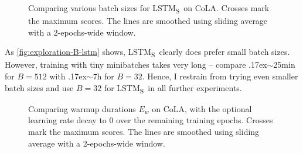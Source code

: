 \documentclass[bsc,frontabs,twoside,singlespacing,parskip,deptreport]{infthesis}
\def\mytilde{{\raise.17ex\hbox{$\scriptstyle\sim$}}}
\def\LSTMS{LSTM\textsubscript{S}}
\def\sliding{The lines are smoothed using sliding average with a 2-epochs-wide window.}
\begin{document}
{{{      \begin{figure}[h!t]
        \centering
        \caption{Comparing various batch sizes for \LSTMS~on CoLA. Crosses mark the maximum scores. \sliding}
        \label{fig:exploration-B-lstm}
      \end{figure}

      As \autoref{fig:exploration-B-lstm} shows, \LSTMS~clearly does prefer small batch sizes. However, training with tiny minibatches takes very long -- compare \mytilde25min for $B=512$ with \mytilde7h for $B=32$. Hence, I restrain from trying even smaller batch sizes and use $B=32$ for \LSTMS~in all further experiments.

      \begin{figure}[h!t]
        \centering
        \caption{Comparing warmup durations $E_w$ on CoLA, with the optional learning rate decay to 0 over the remaining training epochs. Crosses mark the maximum scores. \sliding}
        \label{fig:exploration-schedule}
      \end{figure}

}}}
\end{document}
